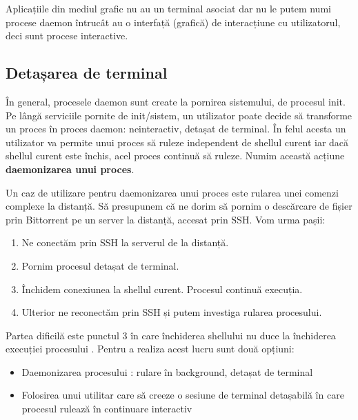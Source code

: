 \begin{note}
Aplicațiile din mediul grafic nu au un terminal asociat dar nu le putem numi
procese daemon întrucât au o interfață (grafică) de interacțiune cu
utilizatorul, deci sunt procese interactive.
\end{note}

\subsection{Detașarea de terminal}
\label{sec:process:detach}

În general, procesele daemon sunt create la pornirea sistemului, de
procesul init. Pe lângă serviciile pornite de init/sistem, un utilizator poate
decide să transforme un proces în proces daemon: neinteractiv, detașat de
terminal. În felul acesta un utilizator va permite unui proces să ruleze
independent de shellul curent iar dacă shellul curent este închis, acel proces
continuă să ruleze. Numim această acțiune \textbf{daemonizarea unui proces}.

Un caz de utilizare pentru daemonizarea unui proces este rularea unei comenzi
complexe la distanță. Să presupunem că ne dorim să pornim o descărcare de fișier
prin Bittorrent pe un server la distanță, accesat prin SSH. Vom urma pașii:

\begin{enumerate}
	\item Ne conectăm prin SSH la serverul de la distanță.
        \item Pornim procesul  detașat de terminal.
        \item Închidem conexiunea la shellul curent. Procesul  continuă execuția.
	\item Ulterior ne reconectăm prin SSH și putem investiga rularea procesului.
\end{enumerate}

Partea dificilă este punctul 3 în care închiderea shellului nu duce la
închiderea execuției procesului . Pentru a realiza acest lucru sunt
două opțiuni:

\begin{itemize}
  \item Daemonizarea procesului : rulare în background, detașat de terminal
  \item Folosirea unui utilitar care să creeze o sesiune de terminal detașabilă în care procesul rulează în continuare interactiv
\end{itemize}

